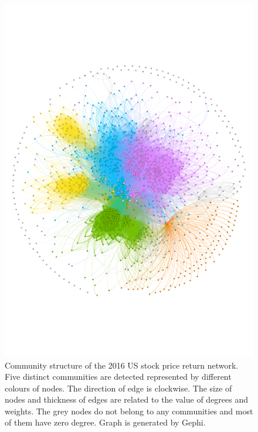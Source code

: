 \begin{figure}
	\begin{center}
		\includegraphics[width=14cm]{community_graph}
	\end{center}
	\caption{Community structure of the 2016 US stock price return network. Five distinct communities are detected represented by different colours of nodes. The direction of edge is  clockwise. The size of nodes and thickness of edges are related to the value of degrees and weights. The grey nodes do not belong to any communities and most of them have zero degree. Graph is generated by Gephi.}
	\label{fig:community_graph}
\end{figure}

